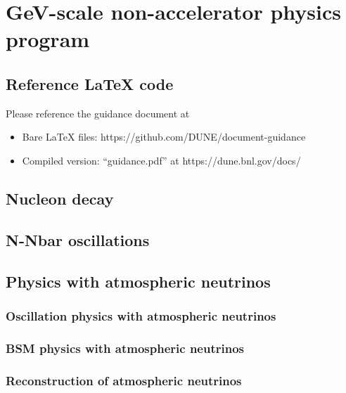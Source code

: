 \chapter{GeV-scale non-accelerator physics program}
\label{ch:nonaccel}


\section{Reference LaTeX code}

Please reference the guidance document at 

\begin{itemize}
\item Bare LaTeX files: https://github.com/DUNE/document-guidance
\item Compiled version: ``guidance.pdf'' at https://dune.bnl.gov/docs/
\end{itemize}


\section{Nucleon decay}
\label{sec:nonaccel-ndk}


\section{N-Nbar oscillations}
\label{sec:nonaccel-nnbar}


\section{Physics with atmospheric neutrinos}
\label{sec:nonaccel-atm}

\subsection{Oscillation physics with atmospheric neutrinos}
\label{sec:nonaccel-atm-oscillations}

\subsection{BSM physics with atmospheric neutrinos}
\label{sec:nonaccel-atm-bsm}

\subsection{Reconstruction of atmospheric neutrinos}
\label{sec:nonaccel-atm-reco}
